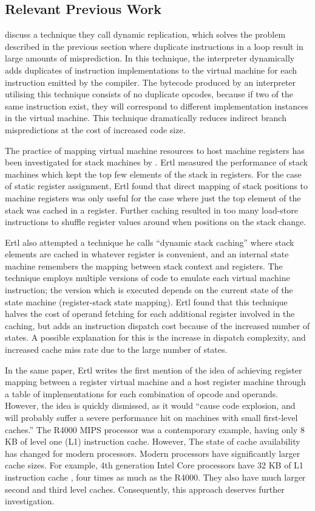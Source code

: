 		\subsection{Relevant Previous Work}
		\cite{optimizingindirectbranch} discuss a technique they call dynamic replication, which solves the problem described in the previous section where duplicate instructions in a loop result in large amounts of misprediction. In this technique, the interpreter dynamically adds duplicates of instruction implementations to the virtual machine for each instruction emitted by the compiler. The bytecode produced by an interpreter utilising this technique consists of no duplicate opcodes, because if two of the same instruction exist, they will correspond to different implementation instances in the virtual machine. This technique dramatically reduces indirect branch mispredictions at the cost of increased code size.
		
		The practice of mapping virtual machine resources to host machine registers has been investigated for stack machines by \cite{stackcaching}. Ertl measured the performance of stack machines which kept the top few elements of the stack in registers. For the case of static register assignment, Ertl found that direct mapping of stack positions to machine registers was only useful for the case where just the top element of the stack was cached in a register. Further caching resulted in too many load-store instructions to shuffle register values around when positions on the stack change.
		
		Ertl also attempted a technique he calls ``dynamic stack caching'' where stack elements are cached in whatever register is convenient, and an internal state machine remembers the mapping between stack context and registers. The technique employs multiple versions of code to emulate each virtual machine instruction; the version which is executed depends on the current state of the state machine (register-stack state mapping). Ertl found that this technique halves the cost of operand fetching for each additional register involved in the caching, but adds an instruction dispatch cost because of the increased number of states. A possible explanation for this is the increase in dispatch complexity, and increased cache miss rate due to the large number of states.
		
		In the same paper, Ertl writes the first mention of the idea of achieving register mapping between a register virtual machine and a host register machine through a table of implementations for each combination of opcode and operands. However, the idea is quickly dismissed, as it would ``cause code explosion, and will probably suffer a severe performance hit on machines with small first-level caches.'' The R4000 MIPS processor was a contemporary example, having only 8 KB of level one (L1) instruction cache. However, The state of cache availability has changed for modern processors. Modern processors have significantly larger cache sizes. For example, 4th generation Intel Core processors have 32 KB of L1 instruction cache \citep{optimisationreference}, four times as much as the R4000. They also have much larger second and third level caches. Consequently, this approach deserves further investigation.

